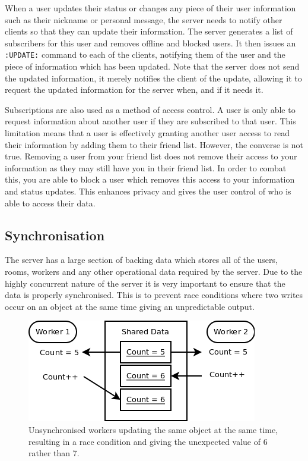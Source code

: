 When a user updates their status or changes any piece of their user information such as their nickname or personal message, the server needs to notify other clients so that they can update their information. The server generates a list of subscribers for this user and removes offline and blocked users. It then issues an \texttt{:UPDATE:} command to each of the clients, notifying them of the user and the piece of information which has been updated. Note that the server does not send the updated information, it merely notifies the client of the update, allowing it to request the updated information for the server when, and if it needs it.

Subscriptions are also used as a method of access control. A user is only able to request information about another user if they are subscribed to that user. This limitation means that a user is effectively granting another user access to read their information by adding them to their friend list. However, the converse is not true. Removing a user from your friend list does not remove their access to your information as they may still have you in their friend list. In order to combat this, you are able to block a user which removes this access to your information and status updates. This enhances privacy and gives the user control of who is able to access their data.

\subsection{Synchronisation}
The server has a large section of backing data which stores all of the users, rooms, workers and any other operational data required by the server. Due to the highly concurrent nature of the server it is very important to ensure that the data is properly synchronised. This is to prevent race conditions where two writes occur on an object at the same time giving an unpredictable output. 

\begin{figure}
    \begin{center}
        \includegraphics[scale=0.6]{Design/diagrams/server_race_condition.png}
        \caption{Unsynchronised workers updating the same object at the same time, resulting in a race condition and giving the unexpected value of 6 rather than 7.}
        \label{RaceConditionDia}
    \end{center}
\end{figure}

